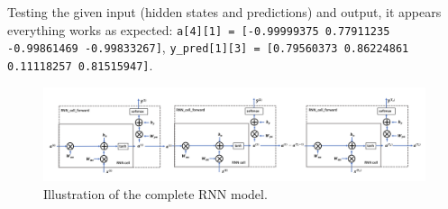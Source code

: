 \documentclass{article}
\def\code#1{\texttt{#1}}
\begin{document}
Testing the given input (hidden states and predictions) and output, it appears everything works as expected: \code{a[4][1] = [-0.99999375  0.77911235 -0.99861469 -0.99833267]},
\code{y\_pred[1][3] = [0.79560373 0.86224861 0.11118257 0.81515947]}.

\begin{figure}
	\centering
	\includegraphics[width=1.0\textwidth]{images/RNN_sequence_of_cells.png}
	\caption{Illustration of the complete RNN model.}
\end{figure}
\end{document}
